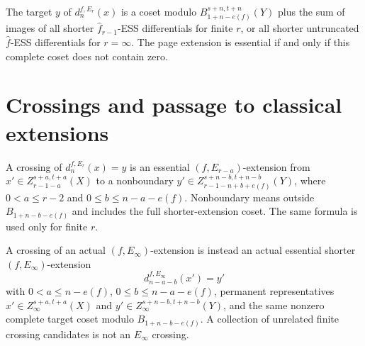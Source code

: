\begin{definition}
  \label{def:page-extension-coset}
  \notready
  The target $y$ of $d_n^{f,E_r}(x)$ is a coset modulo
  $B_{1+n-e(f)}^{s+n,t+n}(Y)$ plus the sum of images of all shorter
  $\widehat f_{r-1}$-ESS differentials for finite $r$, or all shorter
  untruncated $\widehat f$-ESS differentials for $r=\infty$.  The page
  extension is essential if and only if this complete coset does not contain
  zero.
\end{definition}

\section{Crossings and passage to classical extensions}

\begin{definition}
  \label{def:page-extension-crossing}
  \notready
  A crossing of $d_n^{f,E_r}(x)=y$ is an essential
  $(f,E_{r-a})$-extension from
  $x'\in Z_{r-1-a}^{s+a,t+a}(X)$ to a nonboundary
  $y'\in Z_{r-1-n+b+e(f)}^{s+n-b,t+n-b}(Y)$, where
  $0<a\le r-2$ and $0\le b\le n-a-e(f)$.  Nonboundary means outside
  $B_{1+n-b-e(f)}$ and includes the full shorter-extension coset.  The same
  formula is used only for finite $r$.

  A crossing of an actual $(f,E_\infty)$-extension is instead an actual
  essential shorter $(f,E_\infty)$-extension
  \[
    d_{n-a-b}^{f,E_\infty}(x')=y'
  \]
  with $0<a\le n-e(f)$, $0\le b\le n-a-e(f)$, permanent representatives
  $x'\in Z_\infty^{s+a,t+a}(X)$ and
  $y'\in Z_\infty^{s+n-b,t+n-b}(Y)$, and the same nonzero complete target
  coset modulo $B_{1+n-b-e(f)}$.  A collection of unrelated finite crossing
  candidates is not an $E_\infty$ crossing.
\end{definition}
